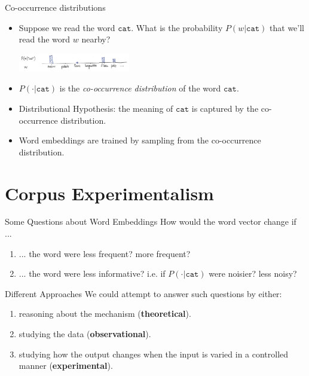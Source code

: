 \documentclass{beamer}
\newcommand{\word}[1]{\texttt{#1}}
\newcommand{\p}{P}
\begin{document}
\begin{frame}{Co-occurrence distributions}
\begin{itemize}
	\item Suppose we read the word $\word{cat}$.  What is the probability $\p ( w | \word{cat})$ that we'll read the word $w$ nearby?
\begin{center}
\includegraphics[height=30px]{dh}
\end{center}
\item $\p ( \cdot | \word{cat})$ is the \textit{co-occurrence distribution} of the word $\word{cat}$.
\item Distributional Hypothesis: the meaning of $\word{cat}$ is captured by the co-occurrence distribution.
\item Word embeddings are trained by sampling from the co-occurrence distribution.
\end{itemize}
\end{frame}

\section{Corpus Experimentalism}

\begin{frame}{Some Questions about Word Embeddings}
How would the word vector change if ...
\begin{enumerate}
	\item ... the word were less frequent? more frequent?
	\item ... the word were less informative? i.e. if $\p ( \cdot | \word{cat})$ were noisier? less noisy?
\end{enumerate}
\end{frame}

\begin{frame}{Different Approaches}
We could attempt to answer such questions by either:
\begin{enumerate}
	\item reasoning about the mechanism (\textbf{theoretical}).
	\item studying the data (\textbf{observational}).
	\item studying how the output changes when the input is varied in a controlled manner (\textbf{experimental}).
\end{enumerate}
\end{frame}
\end{document}

